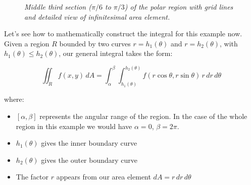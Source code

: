 \begin{figure}[H]
\caption{\textit{Middle third section ($\pi/6$ to $\pi/3$) of the polar region with grid lines and detailed view of infinitesimal area element.}}
\label{fig:polar_region_detail}
\end{figure}

\noindent Let's see how to mathematically construct the integral for this example now. Given a region $R$ bounded by two curves $r = h_1(\theta)$ and $r = h_2(\theta)$, with $h_1(\theta) \leq h_2(\theta)$, our general integral takes the form:

\[
\iint_R f(x,y)\,dA = \int_{\alpha}^{\beta} \int_{h_1(\theta)}^{h_2(\theta)} f(r\cos\theta, r\sin\theta)\,r\,dr\,d\theta
\]

\noindent where:
\begin{itemize}
   \item $[\alpha,\beta]$ represents the angular range of the region. In the case of the whole region in this example we would have $\alpha = 0$, $\beta = 2\pi$.
   \item $h_1(\theta)$ gives the inner boundary curve
   \item $h_2(\theta)$ gives the outer boundary curve
   \item The factor $r$ appears from our area element $dA = r\,dr\,d\theta$
\end{itemize}

